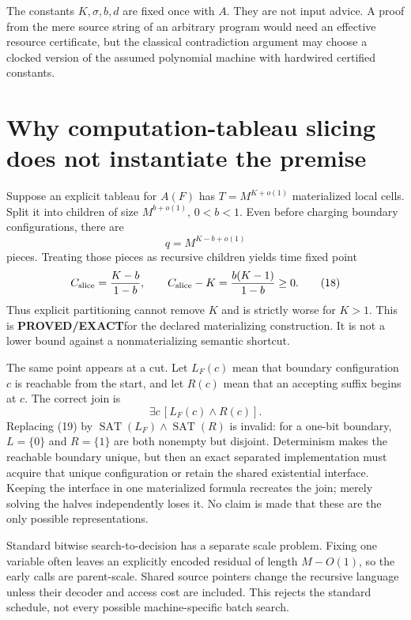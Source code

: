 \documentclass[11pt]{article}
\newcommand{\SAT}{\operatorname{SAT}}
\newcommand{\PROVED}{\textcolor{proved}{\textbf{PROVED/EXACT}}}
\begin{document}
The constants $K,\sigma,b,d$ are fixed once with $A$.  They are not input
advice.  A proof from the mere source string of an arbitrary program would
need an effective resource certificate, but the classical contradiction
argument may choose a clocked version of the assumed polynomial machine with
hardwired certified constants.

\section{Why computation-tableau slicing does not instantiate the premise}

Suppose an explicit tableau for $A(F)$ has $T=M^{K+o(1)}$ materialized local
cells.  Split it into children of size $M^{b+o(1)}$, $0<b<1$.  Even before
charging boundary configurations, there are
\[
 q=M^{K-b+o(1)}
\]
pieces.  Treating those pieces as recursive children yields time fixed point
\begin{equation}
 C_{\rm slice}=\frac{K-b}{1-b},
 \qquad
 C_{\rm slice}-K=\frac{b(K-1)}{1-b}\ge0.                \tag{18}
\end{equation}
Thus explicit partitioning cannot remove $K$ and is strictly worse for
$K>1$.  This is \PROVED for the declared materializing construction.  It is
not a lower bound against a nonmaterializing semantic shortcut.

The same point appears at a cut.  Let $L_F(c)$ mean that boundary
configuration $c$ is reachable from the start, and let $R(c)$ mean that an
accepting suffix begins at $c$.  The correct join is
\begin{equation}
 \exists c\,[L_F(c)\wedge R(c)].                         \tag{19}
\end{equation}
Replacing (19) by $\SAT(L_F)\wedge\SAT(R)$ is invalid: for a one-bit boundary,
$L=\{0\}$ and $R=\{1\}$ are both nonempty but disjoint.  Determinism makes the
reachable boundary unique, but then an exact separated implementation must
acquire that unique configuration or retain the shared existential interface.
Keeping the interface in one materialized formula recreates the join; merely
solving the halves independently loses it.  No claim is made that these are
the only possible representations.

Standard bitwise search-to-decision has a separate scale problem.  Fixing one
variable often leaves an explicitly encoded residual of length
$M-O(1)$, so the early calls are parent-scale.  Shared source pointers change
the recursive language unless their decoder and access cost are included.
This rejects the standard schedule, not every possible machine-specific batch
search.
\end{document}
